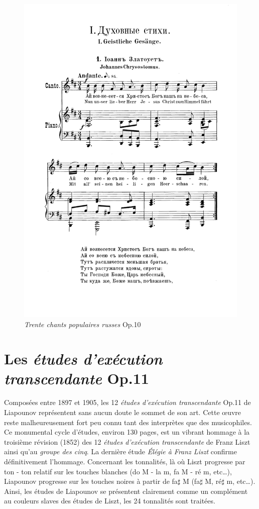 \begin{figure}[!p]
  \includegraphics[width=16cm, keepaspectratio]{chanson.png}
  \caption{\label{chanson}\emph{Trente chants populaires russes} Op.10 }
\end{figure}
\newpage

\section{Les \emph{études d'exécution transcendante} Op.11}

Composées entre 1897 et 1905, les 12 \emph{études d'exécution transcendante} Op.11 de Liapounov représentent sans aucun doute le sommet de son art. Cette œuvre reste malheureusement fort peu connu tant des interprètes que des musicophiles. Ce monumental cycle d'études, environ 130 pages, est un vibrant hommage à la troisième révision (1852) des 12 \emph{études d'exécution transcendante} de Franz Liszt ainsi qu'au \emph{groupe des cinq}. La dernière étude \emph{Élégie à Franz Liszt} confirme définitivement l'hommage. Concernant les tonnalités, là où Liszt progresse par ton - ton relatif sur les touches blanches (do M - la m, fa M - ré m, etc\dots), Liapounov progresse sur les touches noires à partir de fa$\sharp$ M (fa$\sharp$ M, ré$\sharp$ m, etc\dots). Ainsi, les études de Liapounov se présentent clairement comme un complément au couleurs slaves des études de Liszt, les 24 tonnalités sont traitées.

